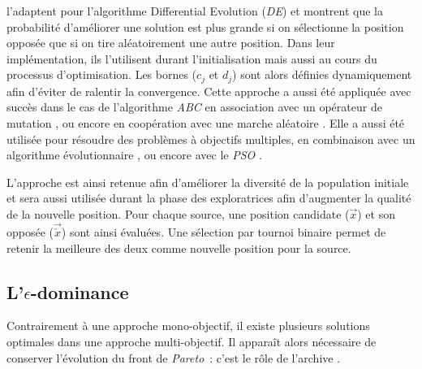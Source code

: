 \textcite{Rahnamayan2008906} l’adaptent pour l’algorithme Differential Evolution (\textit{DE})
et montrent que la probabilité d’améliorer une solution est plus grande si on sélectionne
la position opposée que si on tire aléatoirement une autre position.
Dans leur implémentation, ils l’utilisent durant l’initialisation mais aussi au cours du
processus d’optimisation. Les bornes ($c_{j}$ et $d_{j}$) sont alors définies dynamiquement
afin d’éviter de ralentir la convergence.
Cette approche a aussi été appliquée avec succès dans le cas de l’algorithme \textit{ABC}
en association avec un opérateur de mutation \parencite{Bi2011174}, ou encore en coopération
avec une marche aléatoire \parencite{Sharma2012213}. Elle a aussi été utilisée pour
résoudre des problèmes à objectifs multiples, en combinaison avec un algorithme
évolutionnaire \parencite{Ma201448}, ou encore avec le \textit{PSO} \parencite{Gao2013114}.

L’approche est ainsi retenue afin d’améliorer la diversité de la population initiale
et sera aussi utilisée durant la phase des exploratrices afin d’augmenter la qualité
de la nouvelle position.
Pour chaque source, une position candidate ($\vec{x}$) et son opposée
($\vec{\check{x}}$) sont ainsi évaluées. Une sélection par tournoi binaire permet
de retenir la meilleure des deux comme nouvelle position pour la source.


\subsection[L’epsilon-dominance]{L’$\epsilon$-dominance} %
\label{sub:l_epsilon_dominance}
Contrairement à une approche mono-objectif, il existe plusieurs solutions optimales
dans une approche multi-objectif. Il apparaît alors nécessaire de conserver l’évolution
du front de \textit{Pareto}~: c’est le rôle de l’archive \parencite{Laumanns2002263}.

